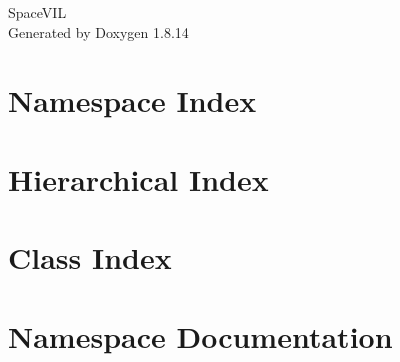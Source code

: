 \documentclass[twoside]{book}
\newcommand{\+}{\discretionary{\mbox{\scriptsize$\hookleftarrow$}}{}{}}
\newcommand{\clearemptydoublepage}{%
  \newpage{\pagestyle{empty}\cleardoublepage}%
}
\begin{document}
\hypersetup{pageanchor=false,
             bookmarksnumbered=true,
             pdfencoding=unicode
            }
\begin{titlepage}
\vspace*{7cm}
\begin{center}%
{\Large Space\+V\+IL }\\
\vspace*{1cm}
{\large Generated by Doxygen 1.8.14}\\
\end{center}
\end{titlepage}
\clearemptydoublepage
{}
\tableofcontents
\clearemptydoublepage
{}
\hypersetup{pageanchor=true}

\chapter{Namespace Index}

\chapter{Hierarchical Index}

\chapter{Class Index}

\chapter{Namespace Documentation}











\end{document}
